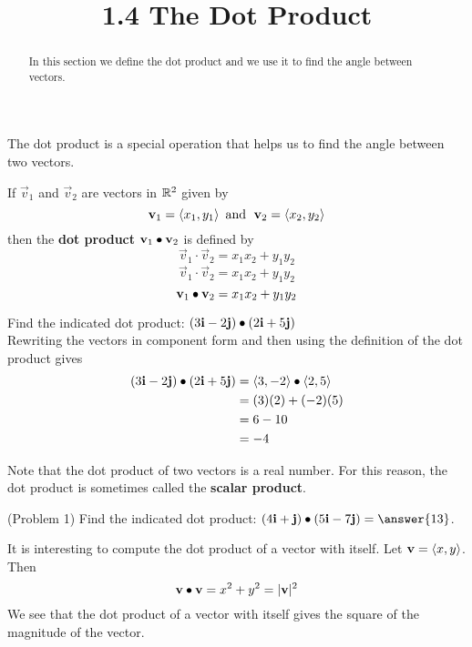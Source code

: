 \documentclass[handout]{ximera}
\title{1.4 The Dot Product}
\begin{document}
\begin{abstract}
In this section we define the dot product and we use it to find the angle between vectors.
\end{abstract}
 
\maketitle
The dot product is a special operation that helps us to find the angle between two vectors.
\begin{definition}
If $\vec{v}_1$ and $\vec{v}_2$ are vectors in $\mathbb R^2$ given by
\[
\mathbf{v}_1 = \left\langle x_1, y_1\right\rangle \text{  and   } \;\mathbf{v}_2 = \left\langle x_2, y_2\right\rangle
\]
then the \textbf{dot product} $\mathbf{v}_1 \bullet \mathbf{v}_2$ is defined by
\[
\vec{v}_1 \cdot \vec{v}_2 = x_1x_2 + y_1y_2
\]
\[
\vec{v}_1 \cdot \vec{v}_2 = x_1x_2 + y_1y_2
\]
\[
\mathbf{v}_1 \bullet \mathbf{v}_2 = x_1x_2 + y_1y_2
\]
\end{definition}

\begin{example}[Example 1]
Find the indicated dot product: $\left(3\mathbf{i} -2\mathbf{j}\right) \bullet \left(2\mathbf{i} +5\mathbf{j}\right)$\\
Rewriting the vectors in component form and then using the definition of the dot product gives
\begin{align*}
\left(3\mathbf{i} -2\mathbf{j}\right) \bullet \left(2\mathbf{i} +5\mathbf{j}\right) &= \left\langle 3, -2\right\rangle \bullet \left\langle 2, 5\right\rangle\\
                                                                      &= (3)(2)+(-2)(5)\\
                                                                      & = 6-10\\
                                                                      &= -4
\end{align*}
\end{example}

Note that the dot product of two vectors is a real number.  For this reason, the dot product is sometimes called the \textbf{scalar product}.

\begin{problem}(Problem 1)
Find the indicated dot product: $\left(4\vec{i} + \vec{j}\right) \dotp \left(5\vec{i} -7\vec{j}\right) =\answer{13}$.\\
\end{problem}

It is interesting to compute the dot product of a vector with itself.  Let $\mathbf{v} = \left\langle x, y\right\rangle$. Then
\[
\mathbf{v} \bullet \mathbf{v} = x^2 + y^2 = |\mathbf{v}|^2
\]
We see that the dot product of a vector with itself gives the square of the magnitude of the vector.
\end{document}
